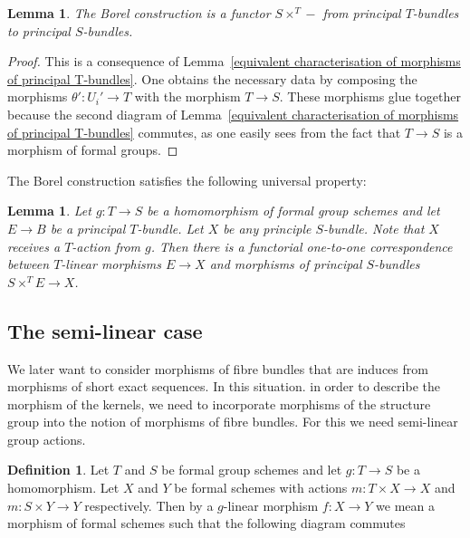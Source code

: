 \documentclass[11pt,oneside]{amsart}
\newtheorem{lemma}[theorem]{Lemma}
\theoremstyle{definition}
\newtheorem{definition}[theorem]{Definition}
\theoremstyle{remark}
\begin{document}
	
	\begin{lemma}\label{change of fibre is functorial}
		The Borel construction is a functor $S\times^T -$ from principal $T$-bundles to principal $S$-bundles.
	\end{lemma}
	\begin{proof}
		This is a consequence of Lemma~\ref{equivalent characterisation of morphisms of principal T-bundles}. One obtains the necessary data by composing the morphisms $\theta':U_i'\rightarrow T$ with the morphism $T\rightarrow S$. These morphisms glue together because the second diagram of Lemma~\ref{equivalent characterisation of morphisms of principal T-bundles} commutes, as one easily sees from the fact that $T\rightarrow S$ is a morphism of formal groups. 
	\end{proof}
	
	The Borel construction satisfies the following universal property:
	\begin{lemma}\label{universal property of associated fibre construction for principal bundles}
		Let $g:T\rightarrow S$ be a homomorphism of formal group schemes and let $E\rightarrow B$ be a principal $T$-bundle. Let $X$ be any principle $S$-bundle. Note that $X$ receives a $T$-action from $g$. Then there is a functorial one-to-one correspondence between $T$-linear morphisms $E\rightarrow X$ and morphisms of principal $S$-bundles $S\times^T E\rightarrow X$.
	\end{lemma}
	
	\subsection{The semi-linear case}
	We later want to consider morphisms of fibre bundles that are induces from morphisms of short exact sequences. In this situation. in order to describe the morphism of the kernels, we need to incorporate morphisms of the structure group into the notion of morphisms of fibre bundles. For this we need semi-linear group actions.
	\begin{definition}
		Let $T$ and $S$ be formal group schemes and let $g:T\rightarrow S$ be a homomorphism. Let $X$ and $Y$ be formal schemes with actions $m:T\times X\rightarrow X$ and $m:S\times Y\rightarrow Y$ respectively. Then by a $g$-linear morphism $f:X\rightarrow Y$ we mean a morphism of formal schemes such that the following diagram commutes
		\begin{center}
		\end{center}
	\end{definition}
	
\end{document}
